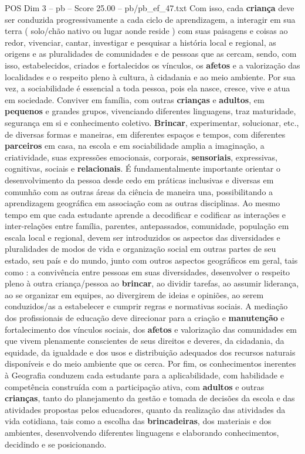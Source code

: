 \begin{textsample}{POS Dim 3 – pb – Score 25.00 – pb/pb\_ef\_47.txt}
Com isso, cada \textbf{criança} deve ser conduzida progressivamente a cada ciclo de aprendizagem, a interagir em sua terra ( solo/chão nativo ou lugar aonde reside ) com suas paisagens e coisas ao redor, vivenciar, cantar, investigar e pesquisar a história local e regional, as origens e as pluralidades de comunidades e de pessoas que as cercam, sendo, com isso, estabelecidos, criados e fortalecidos os vínculos, os \textbf{afetos} e a valorização das localidades e o respeito pleno à cultura, à cidadania e ao meio ambiente.
Por sua vez, a sociabilidade é essencial a toda pessoa, pois ela nasce, cresce, vive e atua em sociedade.
Conviver em família, com outras \textbf{crianças} e \textbf{adultos}, em \textbf{pequenos} e grandes grupos, vivenciando diferentes linguagens, traz maturidade, segurança em si e conhecimento coletivo. \textbf{Brincar}, experimentar, solucionar, etc., de diversas formas e maneiras, em diferentes espaços e tempos, com diferentes \textbf{parceiros} em casa, na escola e em sociabilidade amplia a imaginação, a criatividade, suas expressões emocionais, corporais, \textbf{sensoriais}, expressivas, cognitivas, sociais e \textbf{relacionais}.
É fundamentalmente importante orientar o desenvolvimento da pessoa desde cedo em práticas inclusivas e diversas em comunhão com as outras áreas da ciência de maneira una, possibilitando a aprendizagem geográfica em associação com as outras disciplinas.
Ao mesmo tempo em que cada estudante aprende a decodificar e codificar as interações e inter-relações entre família, parentes, antepassados, comunidade, população em escala local e regional, devem ser introduzidos os aspectos das diversidades e pluralidades de modos de vida e organização social em outras partes de seu estado, seu país e do mundo, junto com outros aspectos geográficos em geral, tais como : a convivência entre pessoas em suas diversidades, desenvolver o respeito pleno à outra criança/pessoa ao \textbf{brincar}, ao dividir tarefas, ao assumir liderança, ao se organizar em equipes, ao divergirem de ideias e opiniões, ao serem conduzidos/as a estabelecer e cumprir regras e normativas sociais.
A mediação dos profissionais de educação deve direcionar para a criação e \textbf{manutenção} e fortalecimento dos vínculos sociais, dos \textbf{afetos} e valorização das comunidades em que vivem plenamente conscientes de seus direitos e deveres, da cidadania, da equidade, da igualdade e dos usos e distribuição adequados dos recursos naturais disponíveis e do meio ambiente que os cerca.
Por fim, os conhecimentos inerentes à Geografia conduzem cada estudante para a aplicabilidade, com habilidade e competência construída com a participação ativa, com \textbf{adultos} e outras \textbf{crianças}, tanto do planejamento da gestão e tomada de decisões da escola e das atividades propostas pelos educadores, quanto da realização das atividades da vida cotidiana, tais como a escolha das \textbf{brincadeiras}, dos materiais e dos ambientes, desenvolvendo diferentes linguagens e elaborando conhecimentos, decidindo e se posicionando.

\end{textsample}
